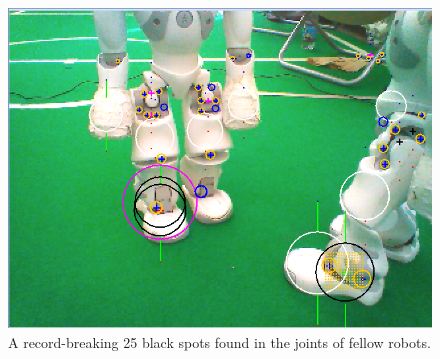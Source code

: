 \documentclass[11pt, twocolumn]{article}
\begin{document}
\begin{figure}
\label{fig:false positives}
\centering
\includegraphics[scale=0.5]{s4.png}
\caption{A record-breaking 25 black spots found in the joints of fellow robots.}
\end{figure}
\end{document}
